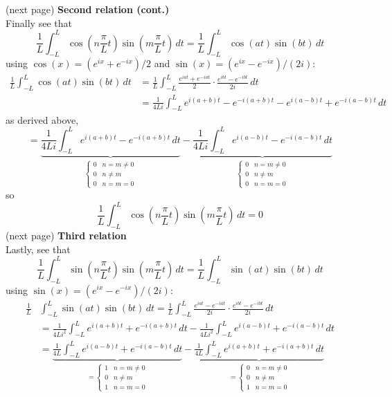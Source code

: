 \documentclass{report}
\begin{document}
(next page)
\newpage
\noindent\textbf{Second relation (cont.)}\\
Finally see that
\begin{equation*}
\frac{1}{L}\int^L_{-L}\cos\left(n\frac{\pi}{L}t\right)\sin\left(m\frac{\pi}{L}t\right)\,dt=
\frac{1}{L}\int^L_{-L}\cos(at)\sin(bt)\,dt
\end{equation*}
using $\cos(x)=(e^{ix}+e^{-ix})/2$ and $\sin(x)=(e^{ix}-e^{-ix})/(2i)$:
\begin{align*}
\frac{1}{L}\int^L_{-L}\cos(at)\sin(bt)\,dt&=
\frac{1}{L}\int^L_{-L}\frac{e^{iat}+e^{-iat}}{2}\cdot
\frac{e^{ibt}-e^{-ibt}}{2i}\,dt\\
&=\frac{1}{4Li}\int^L_{-L}e^{i(a+b)t}-e^{-i(a+b)t}
-e^{i(a-b)t}+e^{-i(a-b)t}\,dt
\end{align*}
as derived above,
\begin{equation*}
=\underbrace{\frac{1}{4Li}\int^L_{-L}e^{i(a+b)t}-e^{-i(a+b)t}\,dt}_{\begin{cases}
0&n=m\neq0\\
0&n\neq m\\
0&n=m=0
\end{cases}}-
\underbrace{\frac{1}{4Li}\int^L_{-L}e^{i(a-b)t}-e^{-i(a-b)t}\,dt}_{\begin{cases}
0&n=m\neq0\\
0&n\neq m\\
0&n=m=0
\end{cases}}
\end{equation*}
so
\begin{equation*}
\frac{1}{L}\int^L_{-L}\cos\left(n\frac{\pi}{L}t\right)\sin\left(m\frac{\pi}{L}t\right)\,dt=0
\end{equation*}
(next page)
\newpage
\noindent\textbf{Third relation}\\
Lastly, see that
\begin{equation*}
\frac{1}{L}\int^L_{-L}\sin\left(n\frac{\pi}{L}t\right)\sin\left(m\frac{\pi}{L}t\right)\,dt=
\frac{1}{L}\int^L_{-L}\sin(at)\sin(bt)\,dt
\end{equation*}
using $\sin(x)=(e^{ix}-e^{-ix})/(2i)$:
\begin{align*}
\frac{1}{L}&\int^L_{-L}\sin(at)\sin(bt)\,dt=
\frac{1}{L}\int^L_{-L}\frac{e^{iat}-e^{-iat}}{2i}\cdot
\frac{e^{ibt}-e^{-ibt}}{2i}\,dt\\
&=\frac{1}{4Li^2}\int^L_{-L}e^{i(a+b)t}+e^{-i(a+b)t}\,dt
-\frac{1}{4Li^2}\int^L_{-L}e^{i(a-b)t}+e^{-i(a-b)t}\,dt\\
&=\underbrace{\frac{1}{4L}\int^L_{-L}e^{i(a-b)t}+e^{-i(a-b)t}\,dt}_{=\begin{cases}
1&n=m\neq0\\
0&n\neq m\\
1&n=m=0
\end{cases}}-
\underbrace{\frac{1}{4L}\int^L_{-L}e^{i(a+b)t}+e^{-i(a+b)t}\,dt}_{=\begin{cases}0&n=m\neq0\\
0&n\neq m\\
1&n=m=0
\end{cases}}
\end{align*}
\end{document}
